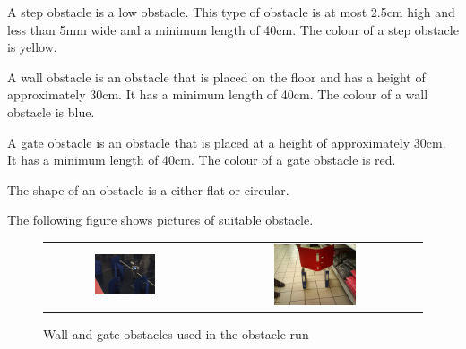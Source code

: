 \documentclass[12pt]{hurocup}
\begin{document}
\label{or-obstacles}

\begin{lawlist}[OR]

\item \label{or-obs-step} A step obstacle is a low obstacle. This type
of obstacle is at most 2.5cm high and less than 5mm wide and a minimum
length of 40cm. The colour of a step obstacle is yellow.

\item \label{or-obs-wall} A wall obstacle is an obstacle that is
placed on the floor and has a height of approximately 30cm. It has
a minimum length of 40cm. The colour of a wall obstacle is blue.

\item \label{or-obs-gate} A gate obstacle is an obstacle that is
placed at a height of approximately 30cm. It has
a minimum length of 40cm. The colour of a gate obstacle is red.

\item The shape of an obstacle is a either flat or circular.

\item The following figure shows pictures of suitable obstacle.

  \begin{figure}
    \begin{center}
      \begin{tabular}{cc}
        \includegraphics[width=0.4\textwidth]{Figures/wall-obstacles} &
        \includegraphics[width=0.4\textwidth]{Figures/gate-obstacle} \\
      \end{tabular}
      \caption{Wall and gate obstacles used in the obstacle run}
      \label{fig:obstacles}
    \end{center}
  \end{figure}


\end{lawlist}
\end{document}
